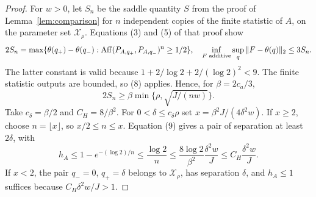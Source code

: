 \begin{proof}
For $w>0$, let $S_n$ be the saddle quantity $S$ from the proof of
Lemma~\ref{lem:comparison} for $n$ independent copies of the finite
statistic of $A$, on the parameter set $\mathcal X_\rho$.
Equations (3) and (5) of that proof show
\[
 2S_n=\max\{\theta(q_+)-\theta(q_-):
             \operatorname{Aff}(P_{A,q_+},P_{A,q_-})^n\ge1/2\},
 \quad \inf_{F\text{ additive}}\sup_q\|F-\theta(q)\|_2\le3S_n.
\]
The latter constant is valid because
$1+2/\log2+2/(\log2)^2<9$. The finite statistic outputs are bounded, so
(8) applies. Hence, for $\beta=2c_a/3$,
\[
 2S_n\ge\beta\min\{\rho,\sqrt{J/(nw)}\}.                 \tag{9}
\]
Take $c_\delta=\beta/2$ and $C_H=8/\beta^2$.
For $0<\delta\le c_\delta\rho$ set
$x=\beta^2J/(4\delta^2w)$. If $x\ge2$, choose $n=\lfloor x\rfloor$,
so $x/2\le n\le x$. Equation (9) gives a pair of separation at least
$2\delta$, with
\[
 h_A\le1-e^{-(\log2)/n}
       \le\frac{\log2}{n}
       \le\frac{8\log2}{\beta^2}\frac{\delta^2w}{J}
       \le C_H\frac{\delta^2w}{J}.
\]
If $x<2$, the pair $q_-=0$, $q_+=\delta$ belongs to
$\mathcal X_\rho$, has separation $\delta$, and $h_A\le1$ suffices
because $C_H\delta^2w/J>1$.
\end{proof}

